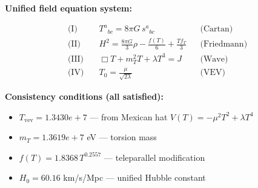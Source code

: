 
\textbf{Unified field equation system:}

\begin{align}
  \text{(I)} \quad & T^a{}_{bc} = 8\pi G \, s^a{}_{bc} && \text{(Cartan)} \\
  \text{(II)} \quad & H^2 = \frac{8\pi G}{3}\rho - \frac{f(T)}{6} + \frac{Tf_T}{3} && \text{(Friedmann)} \\
  \text{(III)} \quad & \Box T + m_T^2 T + \lambda T^3 = J && \text{(Wave)} \\
  \text{(IV)} \quad & T_0 = \frac{\mu}{\sqrt{2\lambda}} && \text{(VEV)}
\end{align}

\textbf{Consistency conditions (all satisfied):}
\begin{itemize}
  \item $T_{\text{vev}} = 1.3430e+7$ — from Mexican hat $V(T) = -\mu^2 T^2 + \lambda T^4$
  \item $m_T = 1.3619e+7$ eV — torsion mass
  \item $f(T) = 1.8368 \, T^{0.2557}$ — teleparallel modification
  \item $H_0 = 60.16$ km/s/Mpc — unified Hubble constant
\end{itemize}